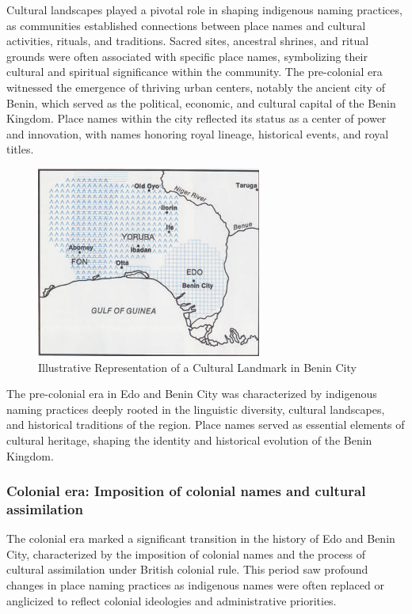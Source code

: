 Cultural landscapes played a pivotal role in shaping indigenous naming practices, as communities established connections between place names and cultural activities, rituals, and traditions. Sacred sites, ancestral shrines, and ritual grounds were often associated with specific place names, symbolizing their cultural and spiritual significance within the community.
The pre-colonial era witnessed the emergence of thriving urban centers, notably the ancient city of Benin, which served as the political, economic, and cultural capital of the Benin Kingdom. Place names within the city reflected its status as a center of power and innovation, with names honoring royal lineage, historical events, and royal titles\cite{egharevba1968short}.

\begin{figure}[h!]
    \centering
    \includegraphics[width=0.9\linewidth]{imauuge.png}
    \caption{Illustrative Representation of a Cultural Landmark in Benin City}
    \label{fig:cultural_landmark_benin}
\end{figure}

The pre-colonial era in Edo and Benin City was characterized by indigenous naming practices deeply rooted in the linguistic diversity, cultural landscapes, and historical traditions of the region. Place names served as essential elements of cultural heritage, shaping the identity and historical evolution of the Benin Kingdom.
\subsubsection{Colonial era: Imposition of colonial names and cultural assimilation}
The colonial era marked a significant transition in the history of Edo and Benin City, characterized by the imposition of colonial names and the process of cultural assimilation under British colonial rule. This period saw profound changes in place naming practices as indigenous names were often replaced or anglicized to reflect colonial ideologies and administrative priorities.


